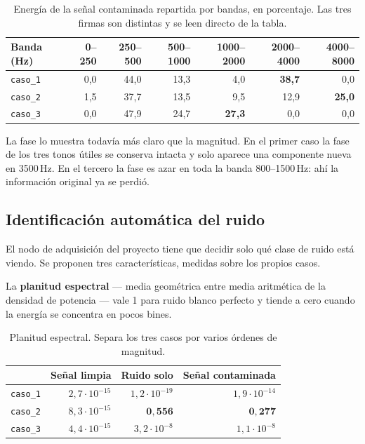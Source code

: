 \begin{table}[H]
\centering\small
\caption{Energía de la señal contaminada repartida por bandas, en porcentaje.
Las tres firmas son distintas y se leen directo de la tabla.}
\begin{tabular}{lrrrrrr}
\toprule
Banda (Hz) & 0--250 & 250--500 & 500--1000 & 1000--2000 & 2000--4000 & 4000--8000 \\
\midrule
\texttt{caso\_1} & 0,0 & 44,0 & 13,3 & 4,0 & \textbf{38,7} & 0,0 \\
\texttt{caso\_2} & 1,5 & 37,7 & 13,5 & 9,5 & 12,9 & \textbf{25,0} \\
\texttt{caso\_3} & 0,0 & 47,9 & 24,7 & \textbf{27,3} & 0,0 & 0,0 \\
\bottomrule
\end{tabular}
\end{table}

La fase lo muestra todavía más claro que la magnitud. En el primer caso la fase
de los tres tonos útiles se conserva intacta y solo aparece una componente nueva
en 3500\,Hz. En el tercero la fase es azar en toda la banda 800--1500\,Hz: ahí la
información original ya se perdió.

\subsection{Identificación automática del ruido}

El nodo de adquisición del proyecto tiene que decidir solo qué clase de ruido
está viendo. Se proponen tres características, medidas sobre los propios casos.

La \textbf{planitud espectral} \cite{oppenheim2010} --- media geométrica entre media
aritmética de la densidad de potencia --- vale 1 para ruido blanco perfecto y tiende a cero cuando
la energía se concentra en pocos bines.

\begin{table}[H]
\centering\small
\caption{Planitud espectral. Separa los tres casos por varios órdenes de magnitud.}
\begin{tabular}{lrrr}
\toprule
 & Señal limpia & Ruido solo & Señal contaminada \\
\midrule
\texttt{caso\_1} & $2{,}7\cdot10^{-15}$ & $1{,}2\cdot10^{-19}$ & $1{,}9\cdot10^{-14}$ \\
\texttt{caso\_2} & $8{,}3\cdot10^{-15}$ & $\mathbf{0{,}556}$   & $\mathbf{0{,}277}$ \\
\texttt{caso\_3} & $4{,}4\cdot10^{-15}$ & $3{,}2\cdot10^{-8}$  & $1{,}1\cdot10^{-8}$ \\
\bottomrule
\end{tabular}
\end{table}

